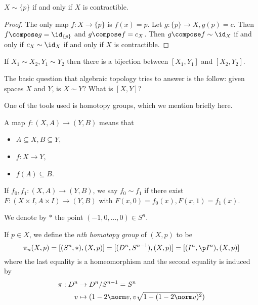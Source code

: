\documentclass[a4paper]{article}
\renewcommand{\b}{\p}
\begin{document}
\begin{eg}
  \(X \sim \{p\}\) if and only if \(X\) is contractible.
\end{eg}

\begin{proof}
  The only map \(f: X \to \{p\}\) is \(f(x) = p\). Let \(g: \{p\} \to X, g(p) = c\). Then \(f \compose g = \id_{\{p\}}\) and \(g \compose f = c_X\). Then \(g \compose f \sim \id_X\) if and only if \(c_X \sim \id_X\) if and only if \(X\) is contractible.
\end{proof}

\begin{lemma}
  If \(X_1 \sim X_2, Y_1 \sim Y_2\) then there is a bijection between \([X_1, Y_1]\) and \([X_2, Y_2]\).
\end{lemma}

The basic question that algebraic topology tries to answer is the follow: given spaces \(X\) and \(Y\), is \(X \sim Y\)? What is \([X, Y]\)?

One of the tools used is homotopy groups, which we mention briefly here.

\begin{definition}
  A map \(f: (X, A) \to (Y, B)\) means that
  \begin{itemize}
  \item \(A \subseteq X, B \subseteq Y\),
  \item \(f: X \to Y\),
  \item \(f(A) \subseteq B\).
  \end{itemize}
\end{definition}

If \(f_0, f_1: (X, A) \to (Y, B)\), we say \(f_0 \sim f_1\) if there exist \(F: (X \times I, A \times I) \to (Y, B)\) with \(F(x, 0) = f_0(x), F(x, 1) = f_1(x)\).

\begin{notation}
  We denote by \(*\) the point \((-1, 0, \dots, 0) \in S^n\).
\end{notation}

\begin{definition}
  If \(p \in X\), we define the \emph{\(n\)th homotopy group} of \((X, p)\) to be
  \[
    \pi_n(X, p) = [(S^n, *), (X, p)] = [(D^n, S^{n - 1}), (X, p)] = [(I^n, \b I^n), (X, p)]
  \]
  where the last equality is a homeomorphism and the second equality is induced by
  \begin{align*}
    \pi: D^n &\to D^n/S^{n -1} = S^n \\
    v &\mapsto (1 - 2 \norm v, v \sqrt{1 - (1 - 2\norm v)^2})
  \end{align*}
\end{definition}
\end{document}
